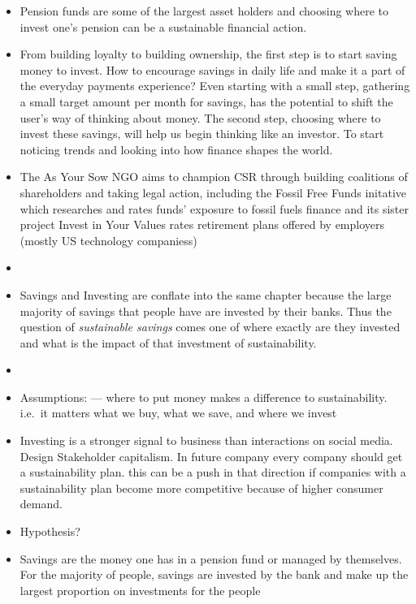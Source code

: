 \documentclass[
  letterpaper,
  DIV=11,
  numbers=noendperiod]{scrartcl}
\begin{document}
\begin{itemize}
\item
  Pension funds are some of the largest asset holders and choosing where
  to invest one's pension can be a sustainable financial action.
\item
  From building loyalty to building ownership, the first step is to
  start saving money to invest. How to encourage savings in daily life
  and make it a part of the everyday payments experience? Even starting
  with a small step, gathering a small target amount per month for
  savings, has the potential to shift the user's way of thinking about
  money. The second step, choosing where to invest these savings, will
  help us begin thinking like an investor. To start noticing trends and
  looking into how finance shapes the world.
\item
  The As Your Sow NGO aims to champion CSR through building coalitions
  of shareholders and taking legal action, including the Fossil Free
  Funds initative which researches and rates funds' exposure to fossil
  fuels finance and its sister project Invest in Your Values rates
  retirement plans offered by employers (mostly US technology
  companiess)
  \citep{asyousowFossilFreeFunds2024, asyousowHomeInvestYour2024}
\item
  \citet{burkartClimateFinanceGets2022}
\item
  Savings and Investing are conflate into the same chapter because the
  large majority of savings that people have are invested by their
  banks. Thus the question of \emph{sustainable savings} comes one of
  where exactly are they invested and what is the impact of that
  investment of sustainability.
\item
\item
  Assumptions: --- where to put money makes a difference to
  sustainability. i.e.~it matters what we buy, what we save, and where
  we invest
\item
  Investing is a stronger signal to business than interactions on social
  media. Design Stakeholder capitalism. In future company every company
  should get a sustainability plan. this can be a push in that direction
  if companies with a sustainability plan become more competitive
  because of higher consumer demand.
\item
  Hypothesis?
\item
  Savings are the money one has in a pension fund or managed by
  themselves. For the majority of people, savings are invested by the
  bank and make up the largest proportion on investments for the people

\end{itemize}
\end{document}
